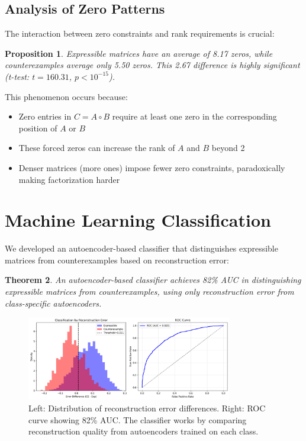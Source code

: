 \documentclass[11pt]{amsart}
\theoremstyle{plain}
\newtheorem{theorem}{Theorem}
\newtheorem{proposition}[theorem]{Proposition}
\theoremstyle{definition}
\theoremstyle{remark}
\begin{document}
\subsection{Analysis of Zero Patterns}

The interaction between zero constraints and rank requirements is crucial:

\begin{proposition}
Expressible matrices have an average of 8.17 zeros, while counterexamples average only 5.50 zeros. This 2.67 difference is highly significant (t-test: $t = 160.31$, $p < 10^{-15}$).
\end{proposition}

This phenomenon occurs because:
\begin{itemize}
\item Zero entries in $C = A \circ B$ require at least one zero in the corresponding position of $A$ or $B$
\item These forced zeros can increase the rank of $A$ and $B$ beyond 2
\item Denser matrices (more ones) impose fewer zero constraints, paradoxically making factorization harder
\end{itemize}

\section{Machine Learning Classification}

We developed an autoencoder-based classifier that distinguishes expressible matrices from counterexamples based on reconstruction error:

\begin{theorem}
An autoencoder-based classifier achieves 82\% AUC in distinguishing expressible matrices from counterexamples, using only reconstruction error from class-specific autoencoders.
\end{theorem}

\begin{figure}[H]
\centering
\includegraphics[width=0.8\textwidth]{../autoencoder_classifier.png}
\caption{Left: Distribution of reconstruction error differences. Right: ROC curve showing 82\% AUC. The classifier works by comparing reconstruction quality from autoencoders trained on each class.}
\end{figure}
\end{document}
